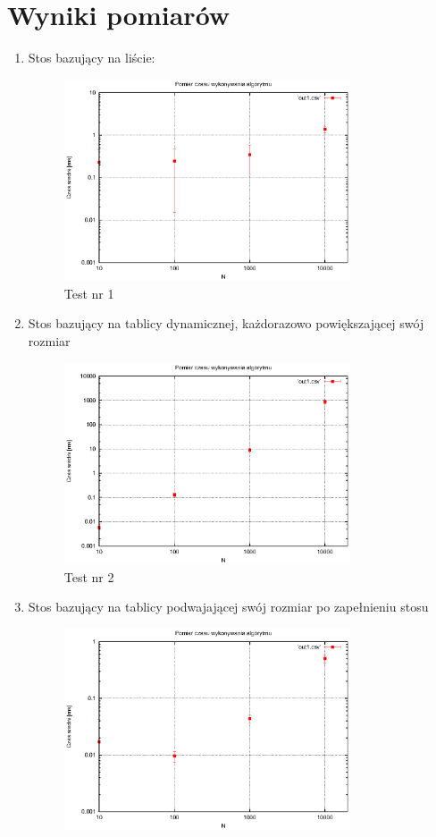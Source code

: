 \documentclass[a4paper,11pt]{article}
\begin{document}
\section{Wyniki pomiarów}
\begin{enumerate}
 \item Stos bazujący na liście:
 \begin{figure}[!ht]
\centering
\includegraphics[width=0.8\textwidth]{wykres1.eps}
\caption{Test nr 1}
\label{Test nr 1}
\end{figure} 
\item Stos bazujący na tablicy dynamicznej, każdorazowo powiększającej swój rozmiar
\begin{figure}[!ht]
\centering
\includegraphics[width=0.8\textwidth]{wykres2.eps}
\caption{Test nr 2}
\label{Test nr 2}
\end{figure} 
\item Stos bazujący na tablicy podwajającej swój rozmiar po zapełnieniu stosu
\begin{figure}[!ht]
\centering
\includegraphics[width=0.8\textwidth]{wykres3.eps}

\end{figure}
\end{enumerate}
\end{document}
